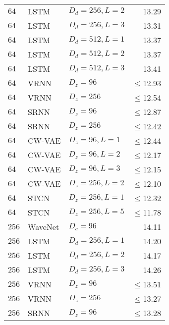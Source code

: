 {\begin{table}[p]
\begin{tabular}{ll|lr}
        $64$      & LSTM                & $D_d=256, L=2$        & 13.29 \\
        $64$      & LSTM                & $D_d=256, L=3$        & 13.31 \\
        $64$      & LSTM                & $D_d=512, L=1$        & 13.37 \\
        $64$      & LSTM                & $D_d=512, L=2$        & 13.37 \\
        $64$      & LSTM                & $D_d=512, L=3$        & 13.41 \\
        $64$      & VRNN                & $D_z=96$              & $\leq$12.93 \\
        $64$      & VRNN                & $D_z=256$             & $\leq$12.54 \\
        $64$      & SRNN                & $D_z=96$              & $\leq$12.87 \\
        $64$      & SRNN                & $D_z=256$             & $\leq$12.42 \\
        $64$      & CW-VAE              & $D_z=96, L=1$         & $\leq$12.44 \\
        $64$      & CW-VAE              & $D_z=96, L=2$         & $\leq$12.17 \\
        $64$      & CW-VAE              & $D_z=96, L=3$         & $\leq$12.15 \\
        $64$      & CW-VAE              & $D_z=256, L=2$        & $\leq$12.10 \\
        $64$ & STCN               & $D_z=256,L=1$               & $\leq$12.32 \\  %
        $64$ & STCN               & $D_z=256,L=5$               & $\leq$11.78 \\
        \midrule
        $256$     & WaveNet             & $D_c=96$              & 14.11 \\
        $256$     & LSTM                & $D_d=256, L=1$        & 14.20 \\
        $256$     & LSTM                & $D_d=256, L=2$        & 14.17 \\
        $256$     & LSTM                & $D_d=256, L=3$        & 14.26 \\
        $256$     & VRNN                & $D_z=96$              & $\leq$13.51 \\
        $256$     & VRNN                & $D_z=256$             & $\leq$13.27 \\
        $256$     & SRNN                & $D_z=96$              & $\leq$13.28 \\

\end{tabular}
\end{table}}
